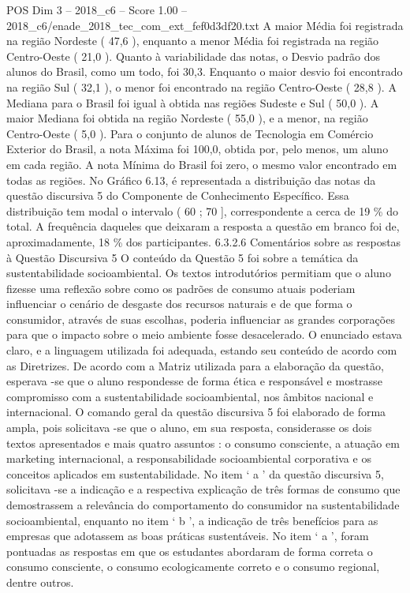 \begin{textsample}{POS Dim 3 – 2018\_c6 – Score 1.00 – 2018\_c6/enade\_2018\_tec\_com\_ext\_fef0d3df20.txt}
A maior Média foi registrada na região Nordeste ( 47,6 ), enquanto a menor Média foi registrada na região Centro-Oeste ( 21,0 ).
Quanto à variabilidade das notas, o Desvio padrão dos alunos do Brasil, como um todo, foi 30,3.
Enquanto o maior desvio foi encontrado na região Sul ( 32,1 ), o menor foi encontrado na região Centro-Oeste ( 28,8 ).
A Mediana para o Brasil foi igual à obtida nas regiões Sudeste e Sul ( 50,0 ).
A maior Mediana foi obtida na região Nordeste ( 55,0 ), e a menor, na região Centro-Oeste ( 5,0 ).
Para o conjunto de alunos de Tecnologia em Comércio Exterior do Brasil, a nota Máxima foi 100,0, obtida por, pelo menos, um aluno em cada região.
A nota Mínima do Brasil foi zero, o mesmo valor encontrado em todas as regiões.
No Gráfico 6.13, é representada a distribuição das notas da questão discursiva 5 do Componente de Conhecimento Específico.
Essa distribuição tem modal o intervalo ( 60 ; 70 ], correspondente a cerca de 19 \% do total.
A frequência daqueles que deixaram a resposta a questão em branco foi de, aproximadamente, 18 \% dos participantes. 6.3.2.6 Comentários sobre as respostas à Questão Discursiva 5 O conteúdo da Questão 5 foi sobre a temática da sustentabilidade socioambiental.
Os textos introdutórios permitiam que o aluno fizesse uma reflexão sobre como os padrões de consumo atuais poderiam influenciar o cenário de desgaste dos recursos naturais e de que forma o consumidor, através de suas escolhas, poderia influenciar as grandes corporações para que o impacto sobre o meio ambiente fosse desacelerado.
O enunciado estava claro, e a linguagem utilizada foi adequada, estando seu conteúdo de acordo com as Diretrizes.
De acordo com a Matriz utilizada para a elaboração da questão, esperava -se que o aluno respondesse de forma ética e responsável e mostrasse compromisso com a sustentabilidade socioambiental, nos âmbitos nacional e internacional.
O comando geral da questão discursiva 5 foi elaborado de forma ampla, pois solicitava -se que o aluno, em sua resposta, considerasse os dois textos apresentados e mais quatro assuntos : o consumo consciente, a atuação em marketing internacional, a responsabilidade socioambiental corporativa e os conceitos aplicados em sustentabilidade.
No item ‘ a ’ da questão discursiva 5, solicitava -se a indicação e a respectiva explicação de três formas de consumo que demostrassem a relevância do comportamento do consumidor na sustentabilidade socioambiental, enquanto no item ‘ b ’, a indicação de três benefícios para as empresas que adotassem as boas práticas sustentáveis.
No item ‘ a ’, foram pontuadas as respostas em que os estudantes abordaram de forma correta o consumo consciente, o consumo ecologicamente correto e o consumo regional, dentre outros.

\end{textsample}
